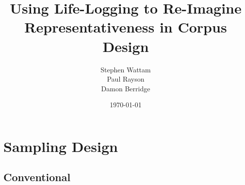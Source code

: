 \documentclass[xcolor=x11names,compress]{beamer}
\title{Using Life-Logging to Re-Imagine Representativeness in Corpus Design}
\author{Stephen Wattam\\
Paul Rayson\\
Damon Berridge}
\institute[2013]{Lancaster University}
\date{\tiny \today}
\begin{document}
\maketitle





% 
% 
% 
% 
%                     
% 
% 
% 

\section{Sampling Design}

\subsection{Conventional}
\end{document}
